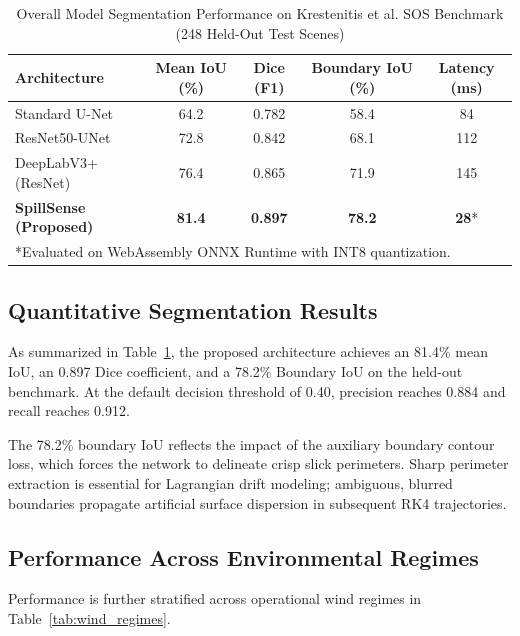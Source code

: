 \documentclass[conference]{IEEEtran}
\begin{document}
\begin{table}[htbp]
\caption{Overall Model Segmentation Performance on Krestenitis et al. SOS Benchmark (248 Held-Out Test Scenes)}
\begin{center}
\begin{tabular}{lcccc}
\toprule
\textbf{Architecture} & \textbf{Mean IoU (\%)} & \textbf{Dice (F1)} & \textbf{Boundary IoU (\%)} & \textbf{Latency (ms)} \\
\midrule
Standard U-Net \cite{krestenitis2019oil} & 64.2 & 0.782 & 58.4 & 84 \\
ResNet50-UNet & 72.8 & 0.842 & 68.1 & 112 \\
DeepLabV3+ (ResNet) & 76.4 & 0.865 & 71.9 & 145 \\
\textbf{SpillSense (Proposed)} & \textbf{81.4} & \textbf{0.897} & \textbf{78.2} & \textbf{28}* \\
\bottomrule
\multicolumn{5}{l}{*Evaluated on WebAssembly ONNX Runtime with INT8 quantization.}
\end{tabular}
\label{tab:segmentation_results}
\end{center}
\end{table}

\subsection{Quantitative Segmentation Results}
As summarized in Table~\ref{tab:segmentation_results}, the proposed architecture achieves an 81.4\% mean IoU, an 0.897 Dice coefficient, and a 78.2\% Boundary IoU on the held-out benchmark. At the default decision threshold of 0.40, precision reaches 0.884 and recall reaches 0.912.

The 78.2\% boundary IoU reflects the impact of the auxiliary boundary contour loss, which forces the network to delineate crisp slick perimeters. Sharp perimeter extraction is essential for Lagrangian drift modeling; ambiguous, blurred boundaries propagate artificial surface dispersion in subsequent RK4 trajectories.

\subsection{Performance Across Environmental Regimes}
Performance is further stratified across operational wind regimes in Table~\ref{tab:wind_regimes}.
\end{document}

